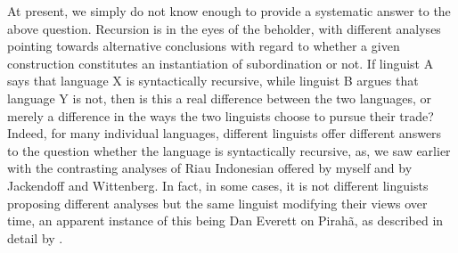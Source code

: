 \documentclass[output=paper,colorlinks,citecolor=brown
]{langscibook}
\begin{document}
At present, we simply do not know enough to provide a systematic answer to the above question.  Recursion is in the eyes of the beholder, with different analyses pointing towards alternative conclusions with regard to whether a given construction constitutes an instantiation of subordination or not.  If linguist A says that language X is syntactically recursive, while linguist B argues that language Y is not, then is this a real difference between the two languages, or merely a difference in the ways the two linguists choose to pursue their trade?  Indeed, for many individual languages, different linguists offer different answers to the question whether the language is syntactically recursive, as, we saw earlier with the contrasting analyses of Riau Indonesian offered by myself and by Jackendoff and Wittenberg. In fact, in some cases, it is not different linguists proposing different analyses but the same linguist modifying their views over time, an apparent instance of this being Dan Everett on Pirahã, as described in detail by .
\end{document}
